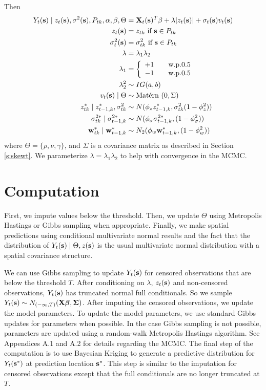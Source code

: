 \documentclass[11pt]{article}
\begin{document}
Then
\begin{align}
   Y_t(\mbox{\bf s}) \mid z_{t}(\mbox{\bf s}), \sigma^2(\mbox{\bf s}), P_{tk}, \alpha, \beta, \Theta &= \mbox{\bf X}_t(\mbox{\bf s})^T \beta + \lambda |z_t(\mbox{\bf s})| + \sigma_t(\mbox{\bf s}) v_t(\mbox{\bf s}) \label{eq:hier}\\
   z_t(\mbox{\bf s}) &= z_{tk} \text{ if } \mbox{\bf s} \in P_{tk}\\
   \sigma^2_{t}(\mbox{\bf s}) &= \sigma^2_{tk} \text{ if } \mbox{\bf s} \in P_{tk}\\
   \lambda &= \lambda_1 \lambda_2\\
   \lambda_1 &= \left\{ \begin{array}{ll}
      +1 \quad & \text{w.p.} 0.5\\
      -1 \quad & \text{w.p.} 0.5
   \end{array}\right.\\
   \lambda^2_2 & \sim IG(a, b)\\
   v_t(\mbox{\bf s}) \mid \Theta &\sim \mbox{Mat$\acute{\mbox{e}}$rn }(0, \Sigma)\\
   z^*_{tk} \mid z^*_{t-1, k}, \sigma^2_{tk} &\sim N(\phi_z z^*_{t-1, k}, \sigma^2_{tk} (1 - \phi_z^2))\\
   \sigma^{2*}_{tk} \mid \sigma^{2*}_{t-1, k} &\sim N(\phi_\sigma \sigma^{2*}_{t-1, k}, (1 - \phi_\sigma^2))\\
   \mbox{\bf w}^*_{tk} \mid \mbox{\bf w}^*_{t-1, k} &\sim N_2(\phi_w \mbox{\bf w}^*_{t-1, k}, (1 - \phi_w^2))
\end{align}
where $\Theta = \{\rho, \nu, \gamma\}$, and $\Sigma$ is a \Matern covariance matrix as described in Section \ref{s:skewt}.
We parameterize $\lambda = \lambda_1 \lambda_2$ to help with convergence in the MCMC.

\section{Computation}\label{s:comp}
First, we impute values below the threshold.
Then, we update $\Theta$ using Metropolis Hastings or Gibbs sampling when appropriate.
Finally, we make spatial predictions using conditional multivariate normal results and the fact that the distribution of $Y_t(\mbox{\bf s}) \mid \Theta, z(\mbox{\bf s})$ is the usual multivariate normal distribution with a \Matern spatial covariance structure.

We can use Gibbs sampling to update $Y_t(\mbox{\bf s})$ for censored observations that are below the threshold $T$.
After conditioning on $\lambda$, $z_t(\mbox{\bf s})$ and non-censored observations, $Y_t(\mbox{\bf s})$ has truncated normal full conditionals.
So we sample $Y_t(\mbox{\bf s}) \sim N_{(-\infty, T)}(\mbox{\bf X} \mbox{\boldmath $\beta$}, \mbox{\boldmath $\Sigma$})$.
After imputing the censored observations, we update the model parameters.
To update the model parameters, we use standard Gibbs updates for parameters when possible.
In the case Gibbs sampling is not possible, parameters are updated using a random-walk Metropolis Hastings algorithm.
See Appendices A.1 and A.2 for details regarding the MCMC.
The final step of the computation is to use Bayesian Kriging to generate a predictive distribution for $Y_t(\mbox{\bf s}^*)$ at prediction location $\mbox{\bf s}^*$.
This step is similar to the imputation for censored observations except that the full conditionals are no longer truncated at $T$.
\end{document}

